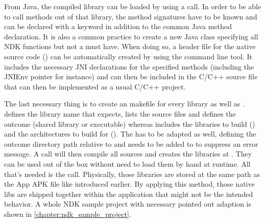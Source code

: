 From Java, the compiled library can be loaded by using a
 call. In order to be able to call methods out 
of that library, the method signatures have to be known and can be declared with 
a  keyword in addition to the common Java method declaration. It is also a 
common practice to create a new Java class specifying all NDK functions but not a must have. When doing so, a header file for the native source code () can be automatically
created by using the  command line tool. It includes the necessary JNI
declarations for the specified methods (including the JNIEnv pointer for instance)
and can then be included in the C/C++ source file that can then be implemented as a
usual C/C++ project.

The last necessary thing is to create an  makefile for every library as well as .  defines the library name that  expects, lists the source files and defines the outcome (shared library or executable) whereas  includes
the libraries to build () and the architectures to build for
(). The  has to be adapted as well, defining the
outcome directory path relative to  and  needs to be added to  to suppress an error message. 
A  call will then compile all sources and creates the libraries
at . They can be used out of the box without need to load them by hand
at runtime. All that's needed is the  call. Physically, those libraries are stored at the same path as the App APK file like introduced earlier. By applying this method, those native libs are shipped together within the application that might not be the intended behavior. A whole NDK sample project with necessary 
pointed out adaption is shown in \autoref{chapter:ndk_sample_project}.

